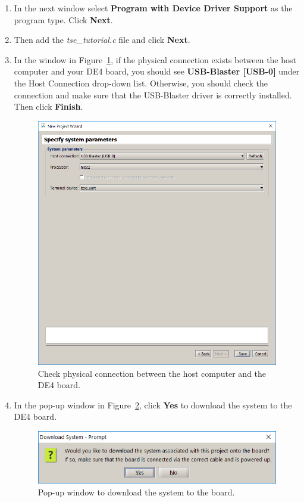 \documentclass[11pt, twoside, pdftex]{article}
\begin{document}
\begin{enumerate}
	\item In the next window select {\bf Program with Device Driver Support} as the program type. Click {\bf Next}.
	
	\item Then add the {\it tse\_tutorial.c} file and click {\bf Next}.
	
	\item In the window in Figure~\ref{fig:monitor_figure2}, if the physical connection exists between the host computer and your DE4 board, you should see {\bf USB-Blaster [USB-0]} under the {Host Connection} drop-down list. Otherwise, you should check the connection and make sure that the USB-Blaster driver is correctly installed. Then click {\bf Finish}.

	\begin{figure}[H]
		\centering
		  \includegraphics[scale=0.7]{figures/monitor_figure2.png}
		\caption{Check physical connection between the host computer and the DE4 board.} 
		\label{fig:monitor_figure2}
	\end{figure}
		
	\item In the pop-up window in Figure~\ref{fig:monitor_figure3}, click {\bf Yes} to download the system to the DE4 board.

	\begin{figure}[H]
		\centering
		  \includegraphics[scale=0.7]{figures/monitor_figure3.png}
		\caption{Pop-up window to download the system to the board.} 
		\label{fig:monitor_figure3}
	\end{figure}
	

\end{enumerate}
\end{document}

